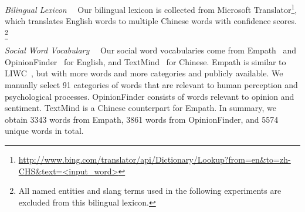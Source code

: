 \textit{Bilingual Lexicon}~~
\label{sec:blpre}
Our bilingual lexicon is collected from Microsoft Translator\footnote{{\url{http://www.bing.com/translator/api/Dictionary/Lookup?from=en&to=zh-CHS&text=<input_word>}}}, which translates English words to multiple
Chinese words with confidence scores. 
\footnote{All named entities and slang terms used
	in the following experiments are excluded from this bilingual lexicon.}



\textit{Social Word Vocabulary}~~
\label{sec:sv}
Our social word vocabularies come from 
Empath~\cite{fast2016empath} and OpinionFinder~\cite{choi2005identifying} 
for English, and TextMind~\cite{gao2013developing} for Chinese.
Empath is similar to LIWC~\cite{pennebaker2001linguistic},
but with more words and more categories and publicly available. 
We manually select 91 categories of words that are 
relevant to human perception and psychological processes. 
OpinionFinder consists of words relevant to opinion and sentiment. 
TextMind is a Chinese counterpart for Empath.
%
In summary, we obtain 3343 words from Empath,  3861 words from OpinionFinder, 
and 5574 unique words in total. 




